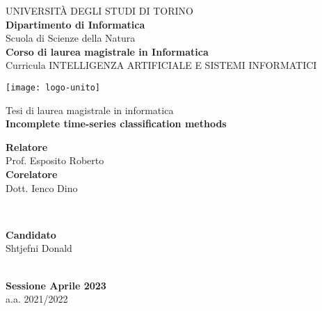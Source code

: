 \begin{titlepage}
  \begin{center}
      {\large \uppercase{Università degli studi di Torino}}\\[0.6cm]
      {\large \bf Dipartimento di Informatica}\\[0.6cm]
      {Scuola di Scienze della Natura}\\[0.6cm]
      {\large \bf Corso di laurea magistrale in Informatica}\\[0.5cm]
      {Curricula INTELLIGENZA ARTIFICIALE E SISTEMI INFORMATICI}\\[0.5cm]
      
      \vspace{0.1cm}
      \begin{center}
          \texttt{[image: logo-unito]}
      \end{center}
      \vspace{0.3cm}
      
      {Tesi di laurea magistrale in informatica}\\[1cm]
      {\huge \bf Incomplete time-series classification methods}\\[2.0cm]
      
     \begin{minipage}{0.4\textwidth}
         \begin{flushleft} \large
             \textbf{Relatore}\\
             {Prof. Esposito Roberto}\\
             \textbf{Corelatore}\\
             {Dott. Ienco Dino}
         \end{flushleft}
     \end{minipage}
     ~
     \begin{minipage}{0.4\textwidth}
         \begin{flushright} \large
             \textbf{Candidato} \\
             {Shtjefni Donald} \\
         \end{flushright}
     \end{minipage}\\[1cm]
     {\bf Sessione Aprile 2023}\\
     {a.a. 2021/2022}
     \clearpage
  \end{center}
\end{titlepage}